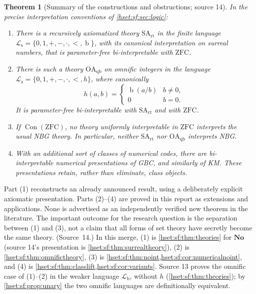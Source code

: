 \documentclass[11pt,letterpaper]{article}
\newtheorem{theorem}{Theorem}[section]
\theoremstyle{definition}
\theoremstyle{remark}
\newcommand{\No}{\mathbf{No}}
\newcommand{\bd}{\operatorname{b}}
\newcommand{\ZFC}{\mathrm{ZFC}}
\newcommand{\Con}{\operatorname{Con}}
\newcommand{\Lb}{\mathcal L_{\mathrm b}}
\newcommand{\Ls}{\mathcal L_{\mathrm s}}
\newcommand{\Lz}{\mathcal L_{\mathrm z}}
\newcommand{\SArt}{\mathrm{SA}_{\mathrm{rt}}}
\newcommand{\OAqb}{\mathrm{OA}_{\mathrm{qb}}}
\begin{document}
\begin{theorem}[Summary of the constructions and obstructions; source 14]
\label{hset:sf:thm:summary}
In the precise interpretation conventions of \cref{hset:sf:sec:logic}:
\begin{enumerate}[label=\textup{(\arabic*)}]
\item There is a recursively axiomatized theory $\SArt$ in the finite language
$\Ls=\{0,1,+,-,\cdot,<,\bd\}$, with its canonical interpretation on surreal
numbers, that is parameter-free bi-interpretable with $\ZFC$.
\item There is such a theory $\OAqb$ on omnific integers in the language
$\Lz=\{0,1,+,-,\cdot,<,h\}$, where canonically
\[
 h(a,b)=\begin{cases}\bd(a/b)&b\ne0,\\0&b=0.\end{cases}
\]
It is parameter-free bi-interpretable with $\SArt$ and with $\ZFC$.
\item If $\Con(\ZFC)$, no theory uniformly interpretable in $\ZFC$ interprets the
usual NBG theory. In particular, neither $\SArt$ nor $\OAqb$ interprets NBG.
\item With an additional sort of classes of numerical codes, there are
bi-interpretable numerical presentations of GBC, and similarly of KM. These
presentations retain, rather than eliminate, class objects.
\end{enumerate}
\end{theorem}

Part (1) reconstructs an already announced result, using a deliberately explicit
axiomatic presentation. Parts (2)--(4) are proved in this report as extensions
and applications. None is advertised as an independently verified new theorem in
the literature. The important outcome for the research question is the separation
between (1) and (3), not a claim that all forms of set theory have secretly
become the same theory. (Source~14.) In this merge, (1) is
\cref{hset:sf:thm:theories} for $\No$ (source 14's presentation is
\cref{hset:sf:thm:surrealtheory}), (2) is \cref{hset:sf:thm:omnifictheory},
(3) is \cref{hset:sf:thm:noint,hset:sf:cor:numericalnoint}, and (4) is
\cref{hset:sf:thm:classlift,hset:sf:cor:variants}. Source 13 proves the omnific
case of (1)--(2) in the weaker language $\Lb$, without $h$
(\cref{hset:sf:thm:theories}); by \cref{hset:sf:prop:unary} the two omnific
languages are definitionally equivalent.
\end{document}
